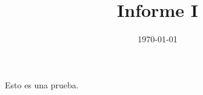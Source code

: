 \documentclass[]{article}
\title{Informe I}
\author{}
\date{\today}
\begin{document}
\maketitle  



\tableofcontents
Esto es una prueba.











\end{document}
